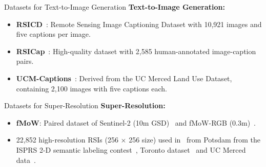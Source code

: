 \begin{refsection}
  \begin{frame}{Datasets for Text-to-Image Generation}
    \textbf{Text-to-Image Generation:}
    \begin{itemize}
      \item \textbf{RSICD}~\parencite{lu2017exploring}: Remote Sensing Image Captioning Dataset with 10,921 images and five captions per image.
      \item \textbf{RSICap}~\parencite{hu2023rsgpt}: High-quality dataset with 2,585 human-annotated image-caption pairs.
      \item \textbf{UCM-Captions}~\parencite{qu2016deep}: Derived from the UC Merced Land Use Dataset, containing 2,100 images with five captions each.
    \end{itemize}
    \bottomleftrefs
  \end{frame}
\end{refsection}

\begin{refsection}
  \begin{frame}{Datasets for Super-Resolution}
    \textbf{Super-Resolution:}
    \begin{itemize}
      \item \textbf{fMoW}: Paired dataset of Sentinel-2 (10m GSD)~\parencite{congFunctionalMapWorld2022} and fMoW-RGB (0.3m)~\parencite{christieFunctionalMapWorld2018}.
      \item 22,852 high-resolution RSIs (256 × 256 size) used in~\parencite{mengConditionalDiffusionModel2024} from Potsdam from the ISPRS 2-D semantic labeling contest~\parencite{postdam}, Toronto dataset~\parencite{ROTTENSTEINER2014256} and UC Merced data~\parencite{ucm2010}.
    \end{itemize}
    \bottomleftrefs
  \end{frame}
\end{refsection}

